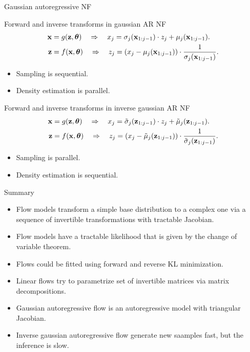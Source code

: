 \begin{frame}{Gaussian autoregressive NF}
	\begin{block}{Forward and inverse transforms in gaussian AR NF}
		\vspace{-0.6cm}
		\begin{align*}
			\mathbf{x} &= g(\mathbf{z}, \boldsymbol{\theta}) \quad \Rightarrow \quad x_j = \sigma_j (\mathbf{x}_{1:j-1}) \cdot z_j + \mu_j(\mathbf{x}_{1:j-1}). \\
			\mathbf{z} &= f(\mathbf{x}, \boldsymbol{\theta}) \quad \Rightarrow \quad z_j = \left(x_j - \mu_j(\mathbf{x}_{1:j-1}) \right) \cdot \frac{1}{\sigma_j (\mathbf{x}_{1:j-1}) }.
		\end{align*}
		\vspace{-0.6cm}
		\begin{itemize}
			\item Sampling is sequential.
			\item Density estimation is parallel.
		\end{itemize}
	\end{block}
	\begin{block}{Forward and inverse transforms in inverse gaussian AR NF}
		\vspace{-0.6cm}
		\begin{align*}
			\mathbf{x} &= g(\mathbf{z}, \boldsymbol{\theta}) \quad \Rightarrow \quad x_j = \tilde{\sigma}_j (\mathbf{z}_{1:j-1}) \cdot z_j + \tilde{\mu}_j(\mathbf{z}_{1:j-1}). \\
			\mathbf{z} &= f(\mathbf{x}, \boldsymbol{\theta}) \quad \Rightarrow \quad z_j = \left(x_j - \tilde{\mu}_j(\mathbf{z}_{1:j-1}) \right) \cdot \frac{1}{\tilde{\sigma}_j (\mathbf{z}_{1:j-1})}.
		\end{align*}
		\vspace{-0.6cm}
		\begin{itemize}
			\item Sampling is parallel.
			\item Density estimation is sequential.
		\end{itemize}
	\end{block}
\end{frame}
\begin{frame}{Summary}
	\begin{itemize}
		\item Flow models transform a simple base distribution to a complex one via a sequence of invertible transformations with tractable Jacobian.
		\vfill
		\item Flow models have a tractable likelihood that is given by the change of variable theorem.
		\vfill
		\item Flows could be fitted using forward and reverse KL minimization. 
		\vfill 
		\item Linear flows try to parametrize set of invertible matrices via matrix decompositions.
		\vfill
		\item Gaussian autoregressive flow is an autoregressive model with triangular Jacobian.
		\vfill
		\item Inverse gaussian autoregressive flow generate new saamples fast, but the inference is slow.
	\end{itemize}
\end{frame}
 